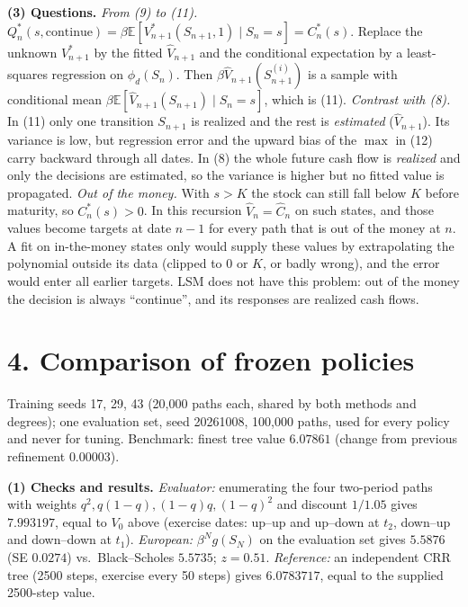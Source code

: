 \documentclass[10pt]{article}
\newcommand{\E}{\mathbb{E}}
\newcommand{\Ch}{\widehat C}
\newcommand{\Vh}{\widehat V}
\begin{document}
\textbf{(3) Questions.}
\emph{From (9) to (11).} $Q^*_n(s,\text{continue})=\beta\E[V^*_{n+1}(S_{n+1},1)\mid S_n=s]=C^*_n(s)$.
Replace the unknown $V^*_{n+1}$ by the fitted $\Vh_{n+1}$ and the conditional expectation by a
least-squares regression on $\phi_d(S_n)$. Then $\beta\Vh_{n+1}(S^{(i)}_{n+1})$ is a sample with
conditional mean $\beta\E[\Vh_{n+1}(S_{n+1})\mid S_n=s]$, which is (11).
\emph{Contrast with (8).} In (11) only one transition $S_{n+1}$ is realized and the rest is
\emph{estimated} ($\Vh_{n+1}$). Its variance is low, but regression error and the upward bias of
the $\max$ in (12) carry backward through all dates. In (8) the whole future cash flow is
\emph{realized} and only the decisions are estimated, so the variance is higher but no fitted value
is propagated.
\emph{Out of the money.} With $s>K$ the stock can still fall below $K$ before maturity, so
$C^*_n(s)>0$. In this recursion $\Vh_n=\Ch_n$ on such states, and those values become targets at
date $n-1$ for every path that is out of the money at $n$. A fit on in-the-money states only would
supply these values by extrapolating the polynomial outside its data (clipped to $0$ or $K$, or
badly wrong), and the error would enter all earlier targets. LSM does not have this problem: out of
the money the decision is always ``continue'', and its responses are realized cash flows.

\section*{4. Comparison of frozen policies}

Training seeds 17, 29, 43 (20,000 paths each, shared by both methods and degrees); one evaluation
set, seed 20261008, 100,000 paths, used for every policy and never for tuning. Benchmark: finest
tree value $6.07861$ (change from previous refinement $0.00003$).

\textbf{(1) Checks and results.}
\emph{Evaluator:} enumerating the four two-period paths with weights $q^2,q(1-q),(1-q)q,(1-q)^2$ and
discount $1/1.05$ gives $7.993197$, equal to $V_0$ above (exercise dates: up--up and up--down at
$t_2$, down--up and down--down at $t_1$).
\emph{European:} $\beta^N g(S_N)$ on the evaluation set gives $5.5876$ (SE $0.0274$) vs.\ Black--Scholes
$5.5735$; $z=0.51$.
\emph{Reference:} an independent CRR tree (2500 steps, exercise every 50 steps) gives $6.0783717$,
equal to the supplied 2500-step value.
\end{document}
